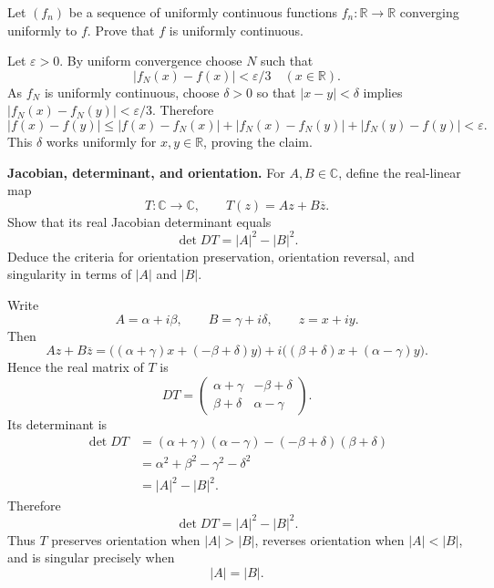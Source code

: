 \begin{problem}[CP-IV-0011]
\label{prob:cp-iv-0011}
Let $(f_n)$ be a sequence of uniformly continuous functions $f_n:\mathbb R\to\mathbb R$ converging uniformly to $f$. Prove that $f$ is uniformly continuous.
\end{problem}

\begin{solution}
Let $\varepsilon>0$. By uniform convergence choose $N$ such that
\[|f_N(x)-f(x)|<\varepsilon/3\quad (x\in\mathbb R).\]
As $f_N$ is uniformly continuous, choose $\delta>0$ so that $|x-y|<\delta$ implies $|f_N(x)-f_N(y)|<\varepsilon/3$. Therefore
\[|f(x)-f(y)|\le|f(x)-f_N(x)|+|f_N(x)-f_N(y)|+|f_N(y)-f(y)|<\varepsilon.\]
This $\delta$ works uniformly for $x,y\in\mathbb R$, proving the claim.
\end{solution}


\begin{problem}[CP-IV-0013]
\label{prob:cp-iv-0013}
\par\noindent\textbf{Jacobian, determinant, and orientation.}\quad
For $A,B\in\mathbb C$, define the real-linear map
\[
T:\mathbb C\longrightarrow\mathbb C,\qquad T(z)=Az+B\overline z.
\]
Show that its real Jacobian determinant equals
\[
\det DT=|A|^2-|B|^2.
\]
Deduce the criteria for orientation preservation, orientation reversal,
and singularity in terms of $|A|$ and $|B|$.
\end{problem}

\begin{solution}
Write
\[
A=\alpha+i\beta,
\qquad
B=\gamma+i\delta,
\qquad
z=x+iy.
\]
Then
\[
Az+B\overline z
=
\bigl((\alpha+\gamma)x+(-\beta+\delta)y\bigr)
+
i\bigl((\beta+\delta)x+(\alpha-\gamma)y\bigr).
\]
Hence the real matrix of \(T\) is
\[
DT=
\begin{pmatrix}
\alpha+\gamma&-\beta+\delta\\
\beta+\delta&\alpha-\gamma
\end{pmatrix}.
\]
Its determinant is
\[
\begin{aligned}
\det DT
&=
(\alpha+\gamma)(\alpha-\gamma)
-
(-\beta+\delta)(\beta+\delta)\\
&=
\alpha^2+\beta^2-\gamma^2-\delta^2\\
&=
|A|^2-|B|^2.
\end{aligned}
\]
Therefore
\[
\boxed{\det DT=|A|^2-|B|^2}.
\]
Thus \(T\) preserves orientation when \(|A|>|B|\), reverses orientation when \(|A|<|B|\), and is singular precisely when
\[
|A|=|B|.
\]
\end{solution}


